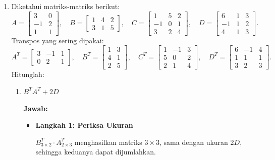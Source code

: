 \documentclass[10pt,a4paper]{article}
\begin{document}
\begin{enumerate}
\begin{enumerate}
\end{enumerate}

\item Diketahui matriks-matriks berikut:
\[
A = \begin{bmatrix} 3 & 0 \\ -1 & 2 \\ 1 & 1 \end{bmatrix}, \quad
B = \begin{bmatrix} 1 & 4 & 2 \\ 3 & 1 & 5 \end{bmatrix}, \quad
C = \begin{bmatrix} 1 & 5 & 2 \\ -1 & 0 & 1 \\ 3 & 2 & 4 \end{bmatrix}, \quad
D = \begin{bmatrix} 6 & 1 & 3 \\ -1 & 1 & 2 \\ 4 & 1 & 3 \end{bmatrix}.
\]
Transpos yang sering dipakai:
\[
A^T = \begin{bmatrix} 3 & -1 & 1 \\ 0 & 2 & 1 \end{bmatrix}, \quad
B^T = \begin{bmatrix} 1 & 3 \\ 4 & 1 \\ 2 & 5 \end{bmatrix}, \quad
C^T = \begin{bmatrix} 1 & -1 & 3 \\ 5 & 0 & 2 \\ 2 & 1 & 4 \end{bmatrix}, \quad
D^T = \begin{bmatrix} 6 & -1 & 4 \\ 1 & 1 & 1 \\ 3 & 2 & 3 \end{bmatrix}.
\]
Hitunglah:
\begin{enumerate}

\item $B^T A^T + 2D$

\textbf{Jawab:}
\begin{itemize}
\item \textbf{Langkah 1: Periksa Ukuran}

$B^T_{3 \times 2} \cdot A^T_{2 \times 3}$ menghasilkan matriks $3 \times 3$, sama dengan ukuran $2D$, sehingga keduanya dapat dijumlahkan.


\end{itemize}
\end{enumerate}
\end{enumerate}
\end{document}
